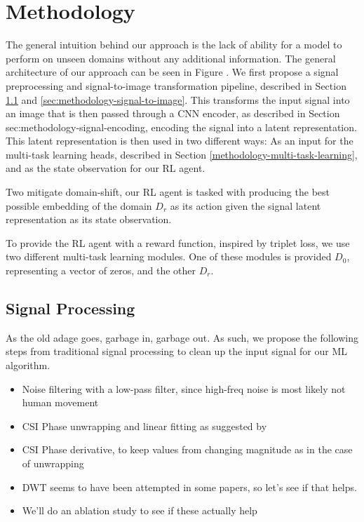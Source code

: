 \chapter{Methodology}\label{chapter:methodology}

The general intuition behind our approach is the lack of ability for a model to perform on unseen domains without any additional information.
The general architecture of our approach can be seen in Figure .
We first propose a signal preprocessing and signal-to-image transformation pipeline, described in Section \ref{sec:methodology-signal-preprocessing} and \ref{sec:methodology-signal-to-image}.
This transforms the input signal into an image that is then passed through a CNN encoder, as described in Section {sec:methodology-signal-encoding}, encoding the signal into a latent representation.
This latent representation is then used in two different ways: As an input for the multi-task learning heads, described in Section \ref{methodology-multi-task-learning}, and as the state observation for our RL agent.

Two mitigate domain-shift, our RL agent is tasked with producing the best possible embedding of the domain $D_{r}$ as its action given the signal latent representation as its state observation.

To provide the RL agent with a reward function, inspired by triplet loss, we use two different multi-task learning modules.
One of these modules is provided $D_{0}$, representing a vector of zeros, and the other $D_{r}$.


\section{Signal Processing}\label{sec:methodology-signal-preprocessing}

As the old adage goes, garbage in, garbage out.
As such, we propose the following steps from traditional signal processing to clean up the input signal for our ML algorithm.

\begin{itemize}
	\item Noise filtering with a low-pass filter, since high-freq noise is most likely not human movement
	\item CSI Phase unwrapping and linear fitting as suggested by \cite{geng2022densepose}
	\item CSI Phase derivative, to keep values from changing magnitude as in the case of unwrapping
	\item DWT seems to have been attempted in some papers, so let's see if that helps.
	\item We'll do an ablation study to see if these actually help
\end{itemize}

